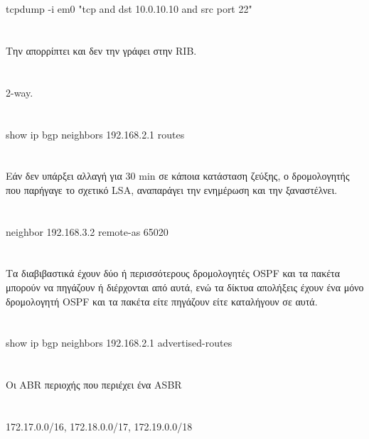 \documentclass[a4paper, 12pt]{article}
\begin{document}
\section{}
	tcpdump -i em0 "tcp and dst 10.0.10.10 and src port 22"

\section{}
	Την απορρίπτει και δεν την γράφει στην RIB.

\section{}
	2-way.

\section{}
	show ip bgp neighbors 192.168.2.1 routes

\section{}
	Εάν δεν υπάρξει αλλαγή για 30 min σε κάποια κατάσταση ζεύξης, ο δρομολογητής που παρήγαγε
	το σχετικό LSA, αναπαράγει την ενημέρωση και την ξαναστέλνει.

\section{}
	neighbor 192.168.3.2 remote-as 65020

\section{}
	Τα διαβιβαστικά έχουν δύο ή περισσότερους δρομολογητές OSPF και τα πακέτα μπορούν να πηγάζουν ή διέρχονται από αυτά, ενώ τα δίκτυα απολήξεις έχουν ένα μόνο δρομολογητή OSPF και τα πακέτα είτε πηγάζουν είτε καταλήγουν σε αυτά.

\section{}
	show ip bgp neighbors 192.168.2.1 advertised-routes

\section{}
	Οι ABR περιοχής που περιέχει ένα ASBR

\section{}
	172.17.0.0/16, 172.18.0.0/17, 172.19.0.0/18
\end{document}
